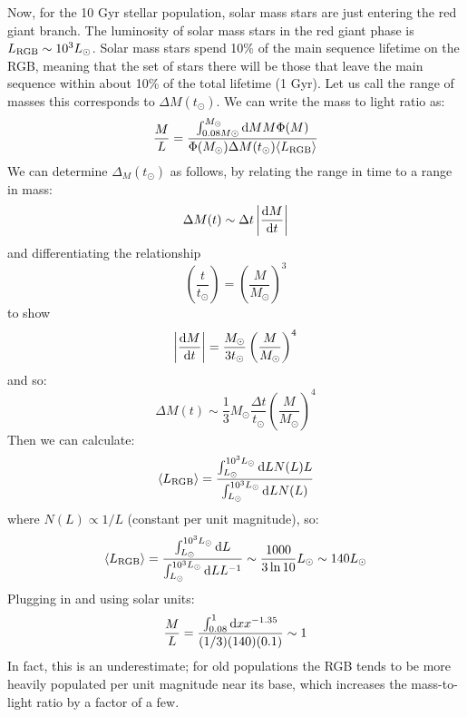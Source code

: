\begin{enumerate}
\begin{answer}
Now, for the 10 Gyr stellar population, solar mass stars are just
entering the red giant branch. The luminosity of solar mass stars in
the red giant phase is $L_{\rm RGB} \sim 10^{3}L_{\odot}$. Solar mass
stars spend 10\% of the main sequence lifetime on the RGB, meaning
that the set of stars there will be those that leave the main sequence
within about 10\% of the total lifetime (1 Gyr). Let us call the range
of masses this corresponds to $\Delta M(t_\odot)$. We can write the
mass to light ratio as:
\begin{equation}
\frac{M}{L} = \frac{\int_{0.08 M\odot}^{M_\odot} {\rm
d}M M \Phi(M)}{\Phi(M_\odot) \Delta M(t_\odot) \langle L_{\rm
RGB}\rangle}
\end{equation}
We can determine $\Delta_M(t_\odot)$ as follows, by relating the range
in time to a range in mass:
\begin{equation}
\Delta M (t) \sim \Delta t \left|\frac{{\rm d}M}{{\rm d}t}\right|
\end{equation}
and differentiating the relationship
\begin{equation}
\left(\frac{t}{t_\odot}\right) = \left(\frac{M}{M_\odot}\right)^3
\end{equation}
to show
\begin{equation}
\left|\frac{{\rm d}M}{{\rm d}t}\right|
= \frac{M_\odot}{3 t_\odot} \left(\frac{M}{M_\odot}\right)^4 
\end{equation}
and so:
\begin{equation}
\Delta M (t) \sim \frac{1}{3} M_\odot \frac{\Delta t}{t_\odot} \left(\frac{M}{M_\odot}\right)^4 
\end{equation}
Then we can calculate:
\begin{equation}
\langle L_{\rm RGB} \rangle =
\frac{\int_{L_\odot}^{10^3 L_\odot} {\rm d}L N(L) L}
{\int_{L_\odot}^{10^3 L_\odot} {\rm d}L N(L)}
\end{equation}
where $N(L)\propto 1/L$ (constant per unit magnitude), so:
\begin{equation}
\langle L_{\rm RGB} \rangle =
\frac{\int_{L_\odot}^{10^3 L_\odot} {\rm d}L}
{\int_{L_\odot}^{10^3 L_\odot} {\rm d}L L^{-1}} \sim \frac{1000}{3\ln
10} L_\odot \sim 140 L_\odot
\end{equation}
Plugging in and using solar units:
\begin{equation}
\frac{M}{L} = \frac{\int_{0.08}^{1} {\rm
d}x x^{-1.35}}{(1/3) (140) (0.1)} \sim 1
\end{equation}
In fact, this is an underestimate; for old populations the
RGB tends to be more heavily populated per unit magnitude near its
base, which increases the mass-to-light ratio by a factor of a few.


\end{answer}
\end{enumerate}
